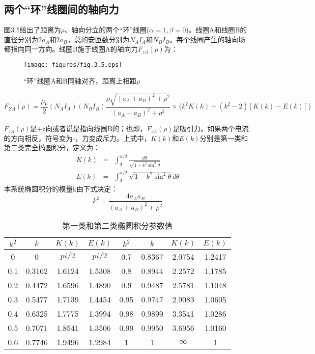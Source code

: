 \subsection{两个“环”线圈间的轴向力}
图3.5给出了距离为$\rho$、轴向分立的两个“环”线圈($\alpha=1,\beta=0$)。线圈A和线圈B的直径分别为$2a_A$和$2a_B$，总的安匝数分别为$N_A I_A$和$N_B I_B$。每个线圈产生的轴向场都指向同一方向。线圈B施于线圈A的轴向力$F_{zA}(\rho)$为：
\begin{figure}[htbp]
	\centering
	\texttt{[image: figures/fig.3.5.eps]}
	\caption{“环”线圈A和B同轴对齐，距离上相距$\rho$}
\end{figure}

\begin{equation}
  F_{ZA}(\rho)=\frac{\mu_0}{2}(N_A I_A)(N_B I_B)\frac{\rho\sqrt{(a_A+a_B)^2+\rho^2}}{(a_A-a_B)^2+\rho^2}\times\{k^2 K(k)+(k^2-2)[K(k)-E(k)]\}
\end{equation}

$F_{zA}(\rho)$是+z向或者说是指向线圈B的；也即，$F_{zA}(\rho)$是吸引力。如果两个电流的方向相反，符号变为-，力变成斥力。上式中，$K(k)$和$E(k)$分别是第一类和第二类完全椭圆积分，定义为：
\begin{eqnarray}
  K(k) &=& \int_{0}^{\pi/2} \frac{d\theta}{\sqrt{1-k^2\sin^2\theta}} \\ \nonumber
  E(k)&=& \int_{0}^{\pi/2}\sqrt{1-k^2 \sin^2\theta}d\theta
\end{eqnarray}
本系统椭圆积分的模量k由下式决定：
\begin{equation}
  k^2=\frac{4a_A a_B}{(a_A+a_B)^2+\rho^2}
\end{equation}



\begin{table}
\centering
\caption{第一类和第二类椭圆积分参数值}
\label{my-label}
\begin{tabular}{|c|c|c|c|c|c|c|c|}
\hline
$k^2$    & $k$  & $K(k)$ &$E(k)$  &$k^2$  & $k$ &$K(k)$  &$E(k)$  \\ \hline
0   & 0 &$pi/2$  & $pi/2$ &0.7&0.8367  &2.0754  & 1.2417 \\ \hline
0.1 & 0.3162  & 1.6124 &1.5308  &0.8& 0.8944 & 2.2572 & 1.1785 \\ \hline
0.2 & 0.4472  & 1.6596 &1.4890  &0.9&0.9487  & 2.5781 & 1.1048 \\ \hline
0.3 & 0.5477  & 1.7139 & 1.4454 &0.95&0.9747  &2.9083  & 1.0605 \\ \hline
0.4 & 0.6325  & 1.7775 &1.3994  &0.98& 0.9899 & 3.3541 & 1.0286 \\ \hline
0.5 & 0.7071  & 1.8541 &1.3506  & 0.99& 0.9950 &3.6956  & 1.0160 \\ \hline
0.6 & 0.7746  & 1.9496 &1.2984  &1  &1  &$\infty$  &  1\\ \hline
\end{tabular}
\end{table}

